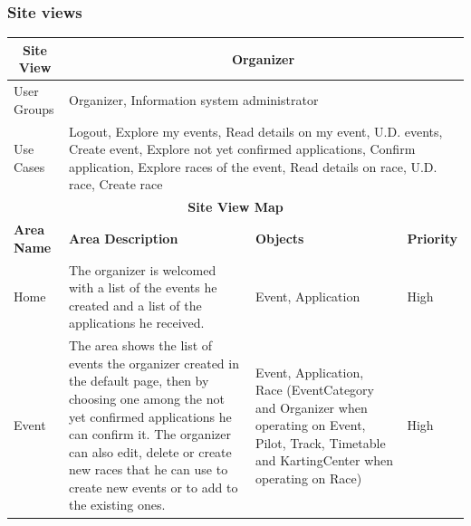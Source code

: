 \documentclass{beamer}
\begin{document}
\begin{frame}
    \frametitle{Site views}
    \begin{table}
        \centering
        \tiny
        \setlength{\tabcolsep}{1pt}
        \begin{tabular}{|m{2cm}|m{4cm}|m{3cm}|m{1cm}|}
        \hline
        \multicolumn{1}{|c|}{\textbf{Site View}} & \multicolumn{3}{c|}{\textbf{Organizer}} \\
        \hline
        User Groups & \multicolumn{3}{m{8cm}|}{Organizer, Information system administrator} \\
        \hline
        Use Cases & \multicolumn{3}{m{8cm}|}{Logout, Explore my events, Read details on my event,
        U.D. events, Create event, Explore not yet confirmed applications, Confirm application, 
        Explore races of the event, Read details on race, U.D. race, Create race} \\
        \hline
        \multicolumn{4}{|c|}{\textbf{Site View Map}} \\
        \hline
        \textbf{Area Name} & \textbf{Area Description} & \textbf{Objects} & \textbf{Priority} \\
        \hline
        Home & The organizer is welcomed with a list of the events he created and a list
        of the applications he received.
         & Event, Application & High \\
        \hline
        Event & The area shows the list of events the organizer created in the default page,
        then by choosing one among the not yet confirmed applications he can confirm it.
        The organizer can also edit, delete or create new races that he can use to 
        create new events or to add to the existing ones.
         & Event, Application, Race (EventCategory and Organizer when operating on Event,
        Pilot, Track, Timetable and KartingCenter when operating on Race)
        & High \\
        \hline
        \end{tabular}
    \end{table}
\end{frame}
\end{document}
